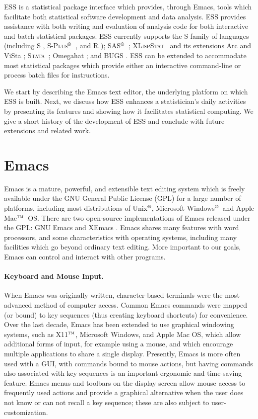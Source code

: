 \documentclass{article}
\newcommand*{\regstrd}{$^{\mbox{\scriptsize{\textregistered}}}$}
\newcommand*{\tm}{$^{\mbox{\scriptsize\sc tm}}$}
\newcommand*{\SAS}{\textsc{SAS}}
\newcommand*{\Splus}{\textsc{S-Plus}}
\newcommand*{\XLispStat}{\textsc{XLispStat}}
\newcommand*{\Stata}{\textsc{Stata}}
\begin{document}
ESS is a statistical package interface which provides, through Emacs,
tools which facilitate both statistical software development and data
analysis.  ESS provides assistance with both writing and evaluation of
analysis code for both interactive and batch statistical packages.
ESS currently supports the S family of languages (including S
\citep{BecRCW88,ChaJH92,ChaJ98}, \Splus\regstrd\ \citep{Splus}, and R
\citep{ihak:gent:1996}); \SAS\regstrd\ \citep{SAS:8}; \XLispStat\ 
\citep{Tier90} and its extensions Arc \citep{Cook:Weisberg:1999} and
ViSta \citep{youn:fald:mcfa:1992}; \Stata\ \citep{Stata:7.0}; Omegahat
\citep{DTLang:2000}; and BUGS \citep{BUGS}.  ESS can be extended to
accommodate most statistical packages which provide either an
interactive command-line or process batch files for instructions.

We start by describing the Emacs text editor, the underlying platform
on which ESS is built.  Next, we discuss how ESS enhances a
statistician's daily activities by presenting its features and showing
how it facilitates statistical computing.  We give a short history of
the development of ESS and conclude with future extensions and related
work.

\section{Emacs}
\label{sec:emacs}

Emacs is a mature, powerful, and extensible text editing system which
is freely available under the GNU General Public License (GPL) for a
large number of platforms, including most distributions of
Unix\regstrd, Microsoft Windows\regstrd\ and Apple Mac\tm\ OS.  There
are two open-source implementations of Emacs released under the GPL:
GNU Emacs \citep{GNU-Emacs} and XEmacs \citep{XEmacs}.  Emacs shares
many features with word processors, and some characteristics with
operating systems, including many facilities which go beyond ordinary
text editing.  More important to our goals, Emacs can control and
interact with other programs.

\paragraph{Keyboard and Mouse Input.}
When Emacs was originally written, character-based terminals were the
most advanced method of computer access.  Common Emacs commands were
mapped (or bound) to key sequences (thus creating keyboard shortcuts)
for convenience.  Over the last decade, Emacs has been extended to use
graphical windowing systems, such as X11\tm, Microsoft Windows, and
Apple Mac OS, which allow additional forms of input, for example using
a mouse, and which encourage multiple applications to share a single
display.  Presently, Emacs is more often used with a GUI, with
commands bound to mouse actions, but having commands also associated
with key sequences is an important ergonomic and time-saving feature.
Emacs menus and toolbars on the display screen allow mouse access to
frequently used actions and provide a graphical alternative when the
user does not know or can not recall a key sequence; these are also
subject to user-customization.
\end{document}
